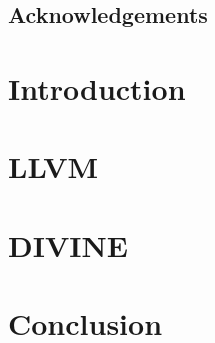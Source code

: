 \documentclass[11pt,twoside,a4paper]{book}
\newcommand{\divine}{\mbox{\textsf{DIVINE}}}
\newcommand{\llvm}{\textsf{LLVM}}
\newcommand{\Jirik}{doc. RNDr. Jiří Barnat, Ph.D.}
\newcommand{\Mornfall}{RNDr. Petr Ročkai, Ph.D.}
\begin{document}
\cleardoublepage

\section*{Acknowledgements}
% 

\cleardoublepage
\thispagestyle{empty}

\pagestyle{headings}
\tableofcontents %
\mainmatter


\chapter{Introduction}\label{chap:introduction}


\chapter{\llvm} \label{chap:llvm}


\chapter{\divine} \label{chap:divine}


\chapter{Conclusion} \label{chap:conclusion}


\printbibliography
\end{document}
